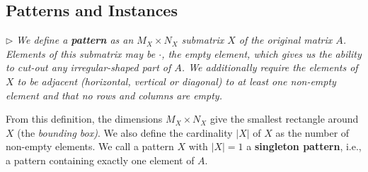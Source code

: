 \documentclass{llncs}
\begin{document}



\subsection{Patterns and Instances}
\noindent $\triangleright$ \emph{We define a \textbf{pattern} as an $M_X\times N_X$ submatrix $X$ of the original matrix $A$. Elements of this submatrix may be $\cdot$, the empty element, which gives us the ability to cut-out any irregular-shaped part of $A$. We additionally require the elements of $X$ to be adjacent (horizontal, vertical or diagonal) to at least one non-empty element and that no rows and columns are empty.}

\smallskip

From this definition, the dimensions $M_X\times N_X$ give the smallest rectangle around $X$ (the \emph{bounding box)}. We also define the cardinality $|X|$ of $X$ as the number of non-empty elements. We call a pattern $X$ with $|X|=1$ a \textbf{singleton pattern}, i.e., a pattern containing exactly one element of $A$. %
\end{document}
